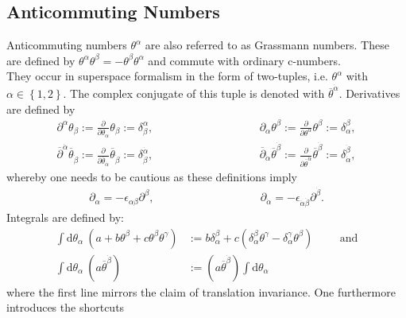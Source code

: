 \subsection{Anticommuting Numbers}\label{sec:AnticommNumbers}
Anticommuting numbers $\theta^\alpha$ are also referred to as Grassmann numbers. These are defined by $\theta^\alpha\theta^\beta = -\theta^\beta\theta^\alpha$ and commute with ordinary c-numbers.\\
They occur in superspace formalism in the form of two-tuples, i.e. $\theta^\alpha$ with $\alpha \in \left\{1,2\right\}$. The complex conjugate of this tuple is denoted with $\overline{\theta}^{\dot{\alpha}}$. 
Derivatives are defined by
\begin{align}
\partial^\alpha \theta_\beta := \frac{\partial}{\partial \theta_\alpha} \theta_\beta := \delta^\alpha_\beta, \hspace{4cm} \partial_\alpha \theta^\beta := \frac{\partial}{\partial \theta^\alpha} \theta^\beta := \delta_\alpha^\beta,\nonumber\\
\overline{\partial}^{\dot{\alpha}} \overline{\theta}_{\dot{\beta}} := \frac{\partial}{\partial \overline{\theta}_{\dot{\alpha}}} \overline{\theta}_{\dot{\beta}} := \delta^{\dot{\alpha}}_{\dot{\beta}}, \hspace{4cm} \overline{\partial}_{\dot{\alpha}} \overline{\theta}^{\dot{\beta}} := \frac{\partial}{\partial \overline{\theta}^{\dot{\alpha}}} \overline{\theta}^{\dot{\beta}} := \delta_{\dot{\alpha}}^{\dot{\beta}},
\end{align}
whereby one needs to be cautious as these definitions imply
\begin{align}
\partial_\alpha = -\epsilon_{\alpha\beta}\partial^\beta, \hspace{4cm} \partial_{\dot{\alpha}} = -\epsilon_{\dot{\alpha}\dot{\beta}}\partial^{\dot{\beta}}.
\end{align}
Integrals are defined by:
\begin{align}
\int\mathrm{d}\theta_\alpha\ (a+b \theta^\beta + c\theta^\beta \theta^\gamma) &:= b\delta_{\alpha}^{\beta} + c (\delta_\alpha^\beta \theta^\gamma - \delta_\alpha^\gamma \theta^\beta) \hspace{1cm} \mathrm{and} \nonumber\\
\int\mathrm{d}\theta_\alpha\ (a\overline{\theta}^{\dot{\beta}}) &:= (a\overline{\theta}^{\dot{\beta}}) \int\mathrm{d}\theta_\alpha\
\end{align}
where the first line mirrors the claim of translation invariance. One furthermore introduces the shortcuts
